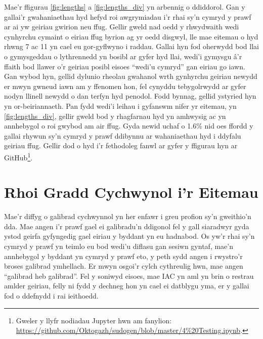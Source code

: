 Mae'r ffigurau \ref{fig:lengths} a \ref{fig:lengths_div} yn arbennig o ddiddorol. Gan y gallai'r gwahaniaethau hyd hefyd roi awgrymiadau i'r rhai sy'n cymryd y prawf ar ai yw geiriau gwirion neu ffug. Gellir gweld nad oedd y rhwydwaith wedi cynhyrchu cymaint o eiriau ffug byrion ag yr oedd disgwyl, lle mae eitemau o hyd rhwng 7 ac 11 yn cael eu gor-gyflwyno i raddau. Gallai hyn fod oherwydd bod llai o gymysgeddau o lythrennedd yn bosibl ar gyfer hyd llai, wedi'i gymysgu â'r ffaith bod llawer o'r geiriau posibl eisoes ``wedi'u cymryd'' gan eiriau go iawn. Gan wybod hyn, gellid dylunio rheolau gwahanol wrth gynhyrchu geiriau newydd er mwyn gwneud iawn am y ffenomen hon, fel cynyddu tebygolrwydd ar gyfer nodyn llinell newydd o dan terfyn hyd penodol. Fodd bynnag, gellid ystyried hyn yn or-beiriannaeth. Pan fydd wedi'i leihau i gyfanswm nifer yr eitemau, yn \ref{fig:lengths_div}, gellir gweld bod y rhagfarnau hyd yn amhwysig ac yn annhebygol o roi gwybod am air ffug. Gyda newid uchaf o 1.6\% nid oes ffordd y gallai rhywun sy'n cymryd y prawf ddibynnu ar wahaniaethau hyd i ddyfalu geiriau ffug. Gellir dod o hyd i'r fethodoleg fanwl ar gyfer y ffigurau hyn ar GitHub\footnote{Gweler y llyfr nodiadau Jupyter hwn am fanylion: \url{https://github.com/Oktogazh/sudogen/blob/master/4\%20Testing.ipynb}.}.

\section{Rhoi Gradd Cychwynol i'r Eitemau}
Mae'r diffyg o galibrad cychwynnol yn her enfawr i greu profion sy'n gweithio'n dda. Mae angen i'r prawf gael ei galibradu'n ddigonol fel y gall siaradwyr gyda ystod geirfa gyfyngedig gael eiriau y byddant yn eu hadnabod. Os yw'r rhai sy'n cymryd y prawf yn teimlo eu bod wedi'u diflasu gan sesiwn gyntaf, mae'n annhebygol y byddant yn cymryd y prawf eto, y peth sydd angen i rwystro'r broses galibrad ymhellach. Er mwyn osgoi'r cylch cythreulig hwn, mae angen ``galibrad heb galibrad''. Fel y soniwyd eisoes, mae IAC yn aml yn brin o restrau amlder geiriau, felly ni fydd y dechneg hon yn cael ei datblygu yma, er y gallai fod o ddefnydd i rai ieithoedd.

